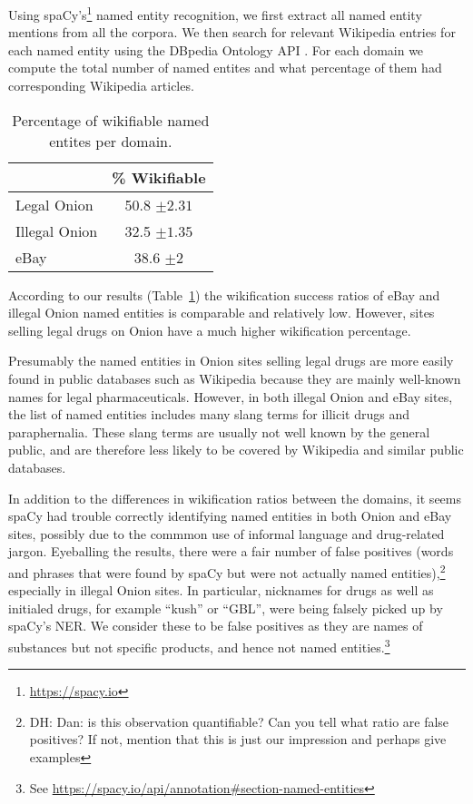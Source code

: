 \documentclass[11pt,a4paper,table]{article}
\newcommand{\daniel}[1]{\footnote{\color{brown}DH: #1}}
\newcommand{\daneldad}[1]{\footnote{\color{green}DE: #1}}
\begin{document}
    Using spaCy's\footnote{\url{https://spacy.io}}
    named entity recognition, we first extract all named
    entity mentions from all the corpora. 
    We then search for relevant Wikipedia entries for each named entity using the DBpedia Ontology API \cite{isem2013daiber}.
    For each domain we compute the total number of named entites and what percentage of them had corresponding Wikipedia articles.

\begin{table}
\begin{center}
\begin{tabular}{l|c}
 & \% Wikifiable\\
 \hline
Legal Onion & 50.8 $\pm2.31$\\
Illegal Onion & 32.5 $\pm1.35$\\
eBay & 38.6 $\pm2$\\
\end{tabular}
\end{center}
\caption{Percentage of wikifiable named entites per domain.\label{ta:wiki}}
\end{table}

According to our results (Table~\ref{ta:wiki}) the wikification success ratios of eBay and illegal Onion named entities is comparable and relatively low. However, sites selling legal drugs on Onion have a much higher wikification percentage.

Presumably the named entities in Onion sites selling legal drugs are
more easily found in public databases such as Wikipedia because they
are mainly well-known names for legal pharmaceuticals. However, in
both illegal Onion and eBay sites, the list of named entities includes
many slang terms for illicit drugs and paraphernalia. These slang terms
are usually not well known by the general public, and are therefore
less likely to be covered by Wikipedia and similar public databases.


In addition to the differences in wikification ratios between
the domains, it seems spaCy had trouble correctly identifying
named entities in both Onion and eBay sites, possibly
due to the commmon use of informal language and drug-related jargon.
Eyeballing the results, there were a fair number of false positives (words and phrases that were found by spaCy but were not actually named entities),\daniel{Dan: is this observation
quantifiable? Can you tell what ratio are false positives? If not,
mention that this is just our impression and perhaps give examples}
especially in illegal Onion sites. In particular, nicknames for drugs as well as initialed drugs, for example ``kush'' or ``GBL'', 
were being falsely picked up by spaCy's NER.
We consider these to be false positives as they are names of substances but not specific products, and hence not named entities.\footnote{See \url{https://spacy.io/api/annotation\#section-named-entities}}
\end{document}
